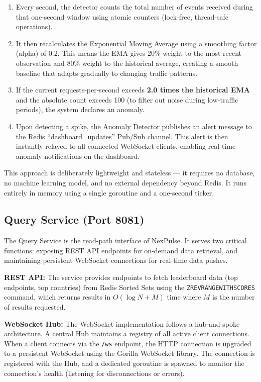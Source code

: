 \documentclass[12pt,a4paper]{article}
\begin{document}
\begin{enumerate}[leftmargin=2em]
    \item Every second, the detector counts the total number of events received during that one-second window using atomic counters (lock-free, thread-safe operations).
    \item It then recalculates the Exponential Moving Average using a smoothing factor (alpha) of 0.2. This means the EMA gives 20\% weight to the most recent observation and 80\% weight to the historical average, creating a smooth baseline that adapts gradually to changing traffic patterns.
    \item If the current requests-per-second exceeds \textbf{2.0 times the historical EMA} and the absolute count exceeds 100 (to filter out noise during low-traffic periods), the system declares an anomaly.
    \item Upon detecting a spike, the Anomaly Detector publishes an alert message to the Redis ``dashboard\_updates'' Pub/Sub channel. This alert is then instantly relayed to all connected WebSocket clients, enabling real-time anomaly notifications on the dashboard.
\end{enumerate}

This approach is deliberately lightweight and stateless --- it requires no database, no machine learning model, and no external dependency beyond Redis. It runs entirely in memory using a single goroutine and a one-second ticker.

\subsection{Query Service (Port 8081)}

The Query Service is the read-path interface of NexPulse. It serves two critical functions: exposing REST API endpoints for on-demand data retrieval, and maintaining persistent WebSocket connections for real-time data pushes.

\textbf{REST API:} The service provides endpoints to fetch leaderboard data (top endpoints, top countries) from Redis Sorted Sets using the \texttt{ZREVRANGEWITHSCORES} command, which returns results in $O(\log N + M)$ time where $M$ is the number of results requested.

\textbf{WebSocket Hub:} The WebSocket implementation follows a hub-and-spoke architecture. A central Hub maintains a registry of all active client connections. When a client connects via the \texttt{/ws} endpoint, the HTTP connection is upgraded to a persistent WebSocket using the Gorilla WebSocket library. The connection is registered with the Hub, and a dedicated goroutine is spawned to monitor the connection's health (listening for disconnections or errors).
\end{document}
